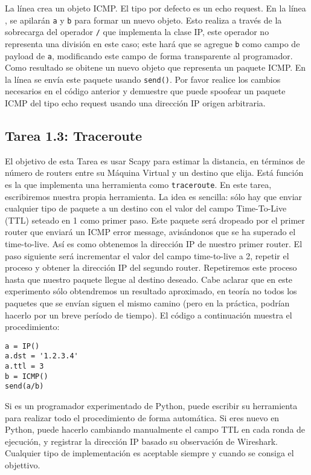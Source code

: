 La línea  crea un objeto ICMP. El tipo por defecto es un echo request. En la línea , se apilarán \texttt{a} y \texttt{b} para formar un nuevo objeto. Esto realiza a través de la sobrecarga del operador \texttt{/} que implementa la clase IP, este operador no representa una división en este caso; este hará que se agregue  \texttt{b} como campo de payload de \texttt{a}, modificando este campo de forma transparente al programador. Como resultado se obitene un nuevo objeto que representa un paquete ICMP. En la línea  se envía este paquete usando \texttt{send()}. Por favor realice los cambios necesarios en el código anterior y demuestre que puede spoofear un paquete ICMP del tipo echo request usando una dirección IP origen arbitraria.


\subsection{Tarea 1.3: Traceroute} 

El objetivo de esta Tarea es usar Scapy para estimar la distancia, en términos de número de routers entre su Máquina Virtual y un destino que elija. Está función es la que implementa una herramienta como \texttt{traceroute}.
En este tarea, escribiremos nuestra propia herramienta. La idea es sencilla: sólo hay que enviar cualquier tipo de paquete a un destino con el valor del campo Time-To-Live (TTL) seteado en 1 como primer paso. Este paquete será dropeado por el primer router que enviará un 
ICMP error message, avisándonos que se ha superado el time-to-live. Así es como obtenemos la dirección IP de nuestro primer router. El paso siguiente será incrementar el valor del campo time-to-live a 2, repetir el proceso y obtener la dirección IP del segundo router. Repetiremos este proceso hasta que nuestro paquete llegue al destino deseado. Cabe aclarar que en este experimento sólo obtendremos un resultado aproximado, en teoría no todos los paquetes que se envían siguen el mismo camino (pero en la práctica, podrían hacerlo por un breve período de tiempo). El código a continuación muestra el procedimiento:


\begin{lstlisting}
a = IP()
a.dst = '1.2.3.4'
a.ttl = 3
b = ICMP()
send(a/b)
\end{lstlisting}

Si es un programador experimentado de Python, puede escribir su herramienta
para realizar todo el procedimiento de forma automática. Si eres nuevo en Python, puede hacerlo cambiando manualmente el campo TTL en cada ronda de ejecución, y registrar la dirección IP basado su observación de Wireshark. Cualquier tipo de implementación es aceptable siempre y cuando se consiga el objettivo.


